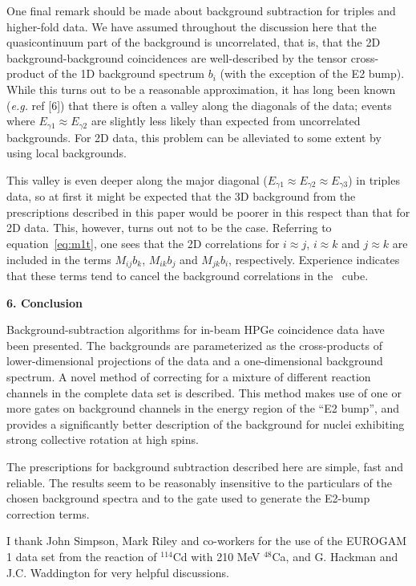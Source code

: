 One final remark should be made about background subtraction for triples and
higher-fold data. We have assumed throughout the discussion here that the
quasicontinuum part of the background is uncorrelated, that is, that the 2D
background-background coincidences are well-described by the tensor
cross-product of the 1D background spectrum $b_i$ (with the exception of the E2
bump). While this turns out to be a reasonable approximation, it has long been
known ({\em e.g.} ref [6]) that there is often a valley along the diagonals of
the data; events where $E_{\gamma1} \approx E_{\gamma2}$ are slightly less
likely than expected from uncorrelated backgrounds. For 2D data, this problem
can be alleviated to some extent by using local backgrounds.

This valley is even deeper along the major diagonal ($E_{\gamma1} \approx
E_{\gamma2} \approx  E_{\gamma3}$) in triples data, so at first it might be
expected that the 3D background from the prescriptions described in this paper
would be poorer in this respect than that for 2D data. This, however, turns out
not to be the case. Referring to equation~\ref{eq:m1t}, one sees that the 2D
correlations for $i \approx j$, $i \approx k$ and $j \approx k$ are included in
the terms $M_{ij}b_k$, $M_{ik}b_j$ and $M_{jk}b_i$, respectively. Experience
indicates that these terms tend to cancel the background correlations in the
\ghghg\ cube.


\begin{center}
{\bf                              6. Conclusion}
\end{center}

Background-subtraction algorithms for in-beam HPGe coincidence data have been
presented. The backgrounds are parameterized as the cross-products of
lower-dimensional projections of the data and a one-dimensional background
spectrum. A novel method of correcting for a mixture of different reaction
channels in the complete data set is described. This method makes use of one or
more gates on background channels in the energy region of the ``E2 bump'', and
provides a significantly better description of the background for nuclei
exhibiting strong collective rotation at high spins.

The prescriptions for background subtraction described here are simple, fast
and reliable. The results seem to be reasonably insensitive to the particulars
of the chosen background spectra and to the gate used to generate the E2-bump
correction terms.

I thank John Simpson, Mark Riley and co-workers for the use of the EUROGAM 1
data set from the reaction of $^{114}$Cd with 210 MeV $^{48}$Ca, and G.
Hackman and J.C. Waddington for very helpful discussions.

